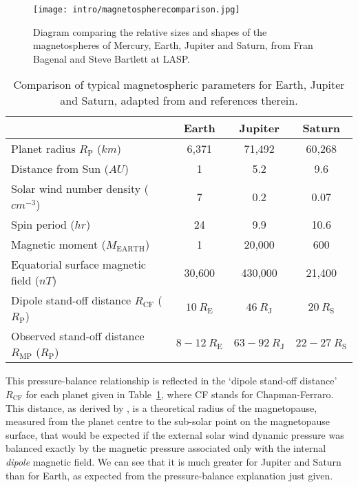 {\begin{figure}
\centering
\noindent\texttt{[image: intro/magnetospherecomparison.jpg]}
\caption[Diagram of Mercury, Earth, Jupiter and Saturn magnetospheres.]{Diagram comparing the relative sizes and shapes of the magnetospheres of Mercury, Earth, Jupiter and Saturn, from Fran Bagenal and Steve Bartlett at LASP.}
\label{intro:fig:magnetospherecomparison}
\end{figure}
\begin{table}
\caption[Comparison of typical magnetospheric parameters for Earth, Jupiter and Saturn.]{Comparison of typical magnetospheric parameters for Earth, Jupiter and Saturn, adapted from \citet{bagenal2014} and references therein.}\label{intro:table:magnetospherecomparison}
\centering
\begin{tabular}{l c c  c}
\hline
  																															& Earth						& Jupiter			& Saturn  \\
\hline
Planet radius $R_\mathrm{P}$ ($\si{km}$)															& 6,371					&	71,492			&	60,268 \\
Distance from Sun ($\si{AU}$)																			&	1							&	5.2				& 9.6		\\
Solar wind number density ($\si{cm^{-3}}$)														& 7							&	0.2				&	0.07		\\
Spin period ($\si{hr}$)																						&	24						& 	9.9				&10.6		\\
Magnetic moment ($\si{M_\mathrm{EARTH}}$)													&	1							&	20,000			&	600		\\
Equatorial surface magnetic field ($\si{nT}$)														&	30,600					&	430,000		&	21,400	\\
Dipole stand-off distance $R_\mathrm{CF}$	($\si{R_\mathrm{P}}$) 				&	$\SI{10}{R_\mathrm{E}}$ & $\SI{46}{R_\mathrm{J}}$ & $\SI{20}{R_\mathrm{S}}$ \\
Observed stand-off distance $R_\mathrm{MP}$ ($\si{R_\mathrm{P}}$)			&	$8-\SI{12}{R_\mathrm{E}}$ & $63-\SI{92}{R_\mathrm{J}}$ & $22-\SI{27}{R_\mathrm{S}}$ \\
\hline
\end{tabular}
\end{table}

This pressure-balance relationship is reflected in the `dipole stand-off distance' $R_\mathrm{CF}$ for each planet given in Table~\ref{intro:table:magnetospherecomparison}, where CF stands for Chapman-Ferraro. This distance, as derived by \citet{chapman1930}, is a theoretical radius of the magnetopause, measured from the planet centre to the sub-solar point on the magnetopause surface, that would be expected if the external solar wind dynamic pressure was balanced exactly by the magnetic pressure associated only with the internal \textit{dipole} magnetic field. We can see that it is much greater for Jupiter and Saturn than for Earth, as expected from the pressure-balance explanation just given.

}
